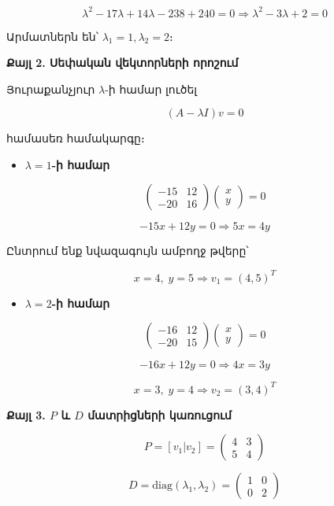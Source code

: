 \documentclass[12pt, a4paper]{article}
\begin{document}
$$
\lambda^2 - 17\lambda + 14\lambda - 238 + 240 = 0
\Rightarrow
\lambda^2 - 3\lambda + 2 = 0
$$

Արմատներն են՝ $\lambda_1 = 1, \lambda_2 = 2$։

\textbf{Քայլ 2. Սեփական վեկտորների որոշում}

Յուրաքանչյուր $\lambda$-ի համար լուծել

$$
(A - \lambda I)v = 0
$$

համասեռ համակարգը։

\begin{itemize}
    \item \textbf{$\lambda = 1$-ի համար}
\end{itemize}

$$
\begin{pmatrix}
-15 & 12 \\
-20 & 16
\end{pmatrix}
\begin{pmatrix}
x \\
y
\end{pmatrix}
=0
$$

$$
-15x + 12y = 0 \Rightarrow 5x = 4y
$$

Ընտրում ենք նվազագույն ամբողջ թվերը՝

$$
x=4,\; y=5 \Rightarrow v_1 = (4,5)^T
$$

\begin{itemize}
    \item \textbf{$\lambda = 2$-ի համար}
\end{itemize}

$$
\begin{pmatrix}
-16 & 12 \\
-20 & 15
\end{pmatrix}
\begin{pmatrix}
x \\
y
\end{pmatrix}
=0
$$

$$
-16x + 12y = 0 \Rightarrow 4x = 3y
$$

$$
x=3,\; y=4 \Rightarrow v_2 = (3,4)^T
$$

\textbf{Քայլ 3. $P$ և $D$ մատրիցների կառուցում}

$$
P = [v_1 | v_2] =
\begin{pmatrix}
4 & 3 \\
5 & 4
\end{pmatrix}
$$

$$
D = \mathrm{diag}(\lambda_1,\lambda_2) =
\begin{pmatrix}
1 & 0 \\
0 & 2
\end{pmatrix}
$$
\end{document}
